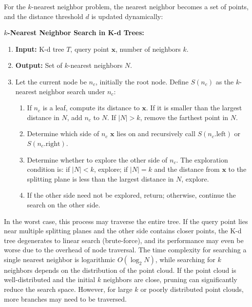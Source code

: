 For the \(k\)-nearest neighbor problem, the nearest neighbor becomes a set of points, and the distance threshold \(d\) is updated dynamically:

\begin{mdframed}
	\textbf{\(k\)-Nearest Neighbor Search in K-d Trees:}
	\begin{enumerate}
		\item \textbf{Input:} K-d tree \(T\), query point \(\bm{x}\), number of neighbors \(k\).
		\item \textbf{Output:} Set of \(k\)-nearest neighbors \(N\).
		\item Let the current node be \(n_c\), initially the root node. Define \(S(n_c)\) as the \(k\)-nearest neighbor search under \(n_c\):
		\begin{enumerate}
			\item If \(n_c\) is a leaf, compute its distance to \(\bm{x}\). If it is smaller than the largest distance in \(N\), add \(n_c\) to \(N\). If \(|N| > k\), remove the farthest point in \(N\).
			\item Determine which side of \(n_c\) \(\bm{x}\) lies on and recursively call \(S(n_c.\text{left})\) or \(S(n_c.\text{right})\).
			\item Determine whether to explore the other side of \(n_c\). The exploration condition is: if \(|N| < k\), explore; if \(|N| = k\) and the distance from \(\bm{x}\) to the splitting plane is less than the largest distance in \(N\), explore.
			\item If the other side need not be explored, return; otherwise, continue the search on the other side.
		\end{enumerate}
	\end{enumerate}
\end{mdframed}

In the worst case, this process may traverse the entire tree. If the query point lies near multiple splitting planes and the other side contains closer points, the K-d tree degenerates to linear search (brute-force), and its performance may even be worse due to the overhead of node traversal. The time complexity for searching a single nearest neighbor is logarithmic \(O(\log_2 N)\), while searching for \(k\) neighbors depends on the distribution of the point cloud. If the point cloud is well-distributed and the initial \(k\) neighbors are close, pruning can significantly reduce the search space. However, for large \(k\) or poorly distributed point clouds, more branches may need to be traversed.


